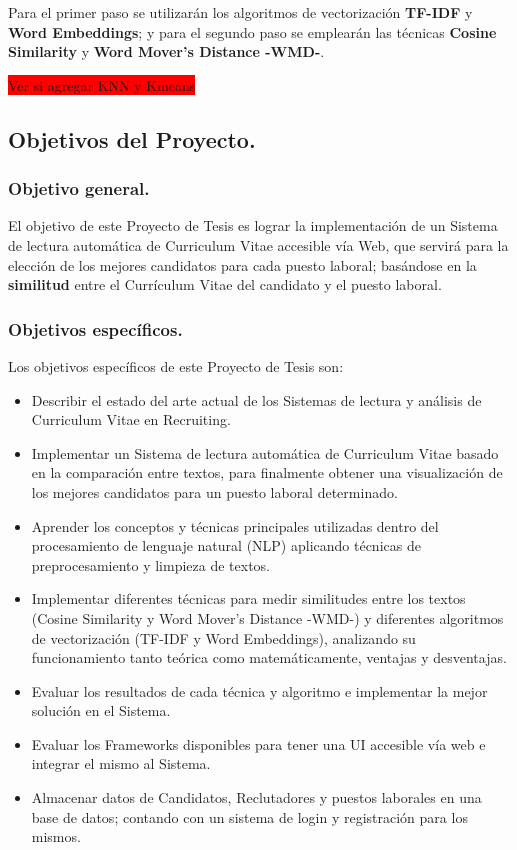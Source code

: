 \documentclass[12pt,a4paper]{article}
\begin{document}
Para el primer paso se utilizarán los algoritmos de vectorización \textbf{TF-IDF} y \textbf{Word Embeddings}; y para el segundo paso se emplearán las técnicas \textbf{Cosine Similarity} y \textbf{Word Mover's Distance -WMD-}.

\colorbox{red}{Ver si agregar KNN y Kmeans}\\

\cleardoublepage    %

\subsection{Objetivos del Proyecto.}

\subsubsection{Objetivo general.}
El objetivo de este Proyecto de Tesis es lograr la implementación de un Sistema de lectura automática de Curriculum Vitae accesible vía Web, que servirá para la elección de los mejores candidatos para cada puesto laboral; basándose en la \textbf{similitud} entre el Currículum Vitae del candidato y el puesto laboral. 

\subsubsection{Objetivos específicos.}
Los objetivos específicos de este Proyecto de Tesis son:
\begin{itemize}
\item Describir el estado del arte actual de los Sistemas de lectura y análisis de Curriculum Vitae en Recruiting. 
\item Implementar un Sistema de lectura automática de Curriculum Vitae basado en la comparación entre textos, para finalmente obtener una visualización de los mejores candidatos para un puesto laboral determinado.  
\item Aprender los conceptos y técnicas principales utilizadas dentro del procesamiento de lenguaje natural (NLP) aplicando técnicas de preprocesamiento y limpieza de textos.
\item Implementar diferentes técnicas para medir similitudes entre los textos (Cosine Similarity y  Word Mover's Distance -WMD-) y diferentes algoritmos de vectorización (TF-IDF y Word Embeddings), analizando su funcionamiento tanto teórica como matemáticamente, ventajas y desventajas.
\item Evaluar los resultados de cada técnica y algoritmo e implementar la mejor solución en el Sistema.
\item Evaluar los Frameworks disponibles para tener una UI accesible vía web e integrar el mismo al Sistema.
\item Almacenar datos de Candidatos, Reclutadores y puestos laborales en una base de datos; contando con un sistema de login y registración para los mismos.
\end{itemize} 
\end{document}
